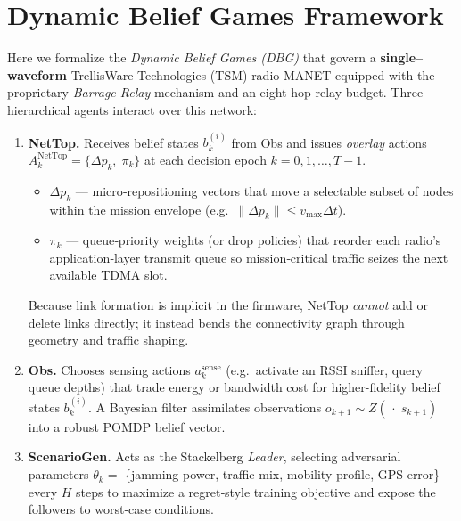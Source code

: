 \documentclass[doc.tex]{subfiles}
\begin{document}
\section{Dynamic Belief Games Framework}
\label{sec:mathematical_framework}

Here we formalize the \emph{Dynamic Belief Games (DBG)} that govern
a \textbf{single–waveform} TrellisWare Technologies (TSM) radio MANET equipped
with the proprietary \emph{Barrage Relay} mechanism
and an eight‑hop relay budget. Three hierarchical agents interact over
this network:

\begin{enumerate}
  \item \textbf{NetTop.}  
        Receives belief states ${b_k^{(i)}}$ from Obs
        and issues \emph{overlay} actions
        $A^{\mathrm{NetTop}}_k=\{\Delta p_k,\;\pi_k\}$ at each
        decision epoch $k=0,1,\dots,T{-}1$.
        \begin{itemize}
          \item $\Delta p_k$ — micro‑repositioning vectors that move
                a selectable subset of nodes within the mission
                envelope (e.g.\ $\lVert\Delta p_k\rVert \le v_{\max}\Delta t$).
          \item $\pi_k$ — queue‑priority weights (or drop policies)
                that reorder each radio’s application‑layer transmit
                queue so mission‑critical traffic seizes the next
                available TDMA slot.
        \end{itemize}
        Because link formation is implicit in the firmware, NetTop
        \emph{cannot} add or delete links directly; it instead
        bends the connectivity graph through geometry and traffic
        shaping.

  \item \textbf{Obs.}  
        Chooses sensing actions $a^{\mathrm{sense}}_k$ (e.g.\ activate
        an RSSI sniffer, query queue depths) that trade energy or
        bandwidth cost for higher-fidelity belief states $b_k^{(i)}$. A
        Bayesian filter assimilates observations
        $o_{k+1}\!\sim\!Z(\,\cdot\mid s_{k+1})$ into a
        robust POMDP belief vector.

  \item \textbf{ScenarioGen.}  
        Acts as the Stackelberg \emph{Leader}, selecting adversarial
        parameters
$\theta_k=$ \{jamming power, traffic mix, mobility profile, GPS error\}
        every $H$ steps to maximize a regret‑style training objective
        and expose the followers to worst‑case conditions.
\end{enumerate}
\end{document}
